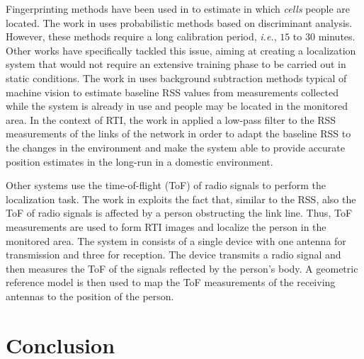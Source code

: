 \documentclass[conference]{IEEEtran}
\begin{document}
Fingerprinting methods have been used in \cite{Xu_2013,Xu_2012} to estimate in which \emph{cells} people are located. The work in \cite{Xu_2012} uses probabilistic methods based on discriminant analysis. However, these methods require a long calibration period, \emph{i.e.}, $15$ to $30$ minutes. Other works have specifically tackled this issue, aiming at creating a localization system that would not require an extensive training phase to be carried out in static conditions. The work in \cite{Rabbat_background} uses background subtraction methods typical of machine vision to estimate baseline RSS values from measurements collected while the system is already in use and people may be located in the monitored area. In the context of RTI, the work in \cite{Grandma_2012} applied a low-pass filter to the RSS measurements of the links of the network in order to adapt the baseline RSS to the changes in the environment and make the system able to provide accurate position estimates in the long-run in a domestic environment.

Other systems use the time-of-flight (ToF) of radio signals to perform the localization task. The work in \cite{ToF_RTI} exploits the fact that, similar to the RSS, also the ToF of radio signals is affected by a person obstructing the link line. Thus, ToF measurements are used to form RTI images and localize the person in the monitored area. The system in \cite{MIT_3D_tracking} consists of a single device with one antenna for transmission and three for reception. The device transmits a radio signal and then measures the ToF of the signals reflected by the person's body. A geometric reference model is then used to map the ToF measurements of the receiving antennas to the position of the person.









\section{Conclusion}
\label{sec:conclusion}
\end{document}
